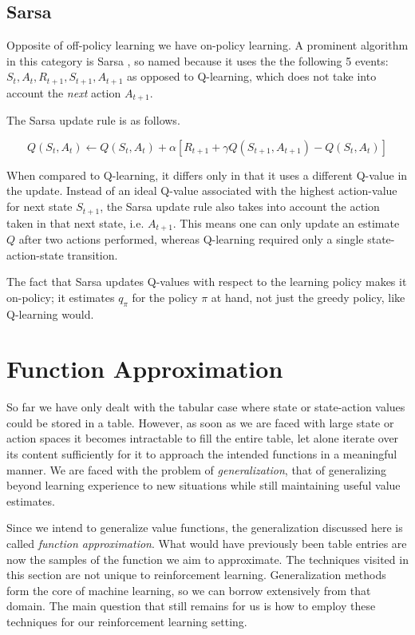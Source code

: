 \subsection{Sarsa}
\label{sub:sarsa}
Opposite of off-policy learning we have on-policy learning.
A prominent algorithm in this category is Sarsa
\parencite{rummery1994line},
so named because it uses the the following 5 events:
$S_t, A_t, R_{t+1}, S_{t+1}, A_{t+1}$
as opposed to Q-learning, which does not take into account
the \textit{next} action $A_{t+1}$.

The Sarsa update rule is as follows.

\begin{equation}
  \label{eq:sarsa}
  Q(S_t, A_t) \leftarrow Q(S_t, A_t) + \alpha \left[ R_{t+1} + \gamma Q(S_{t+1}, A_{t+1}) - Q(S_t, A_t) \right]
\end{equation}

When compared to Q-learning,
it differs only in that it uses a different Q-value in the update.
Instead of an ideal Q-value associated with the highest action-value
for next state $S_{t+1}$,
the Sarsa update rule also takes into account
the action taken in that next state, i.e. $A_{t+1}$.
This means one can only update an estimate $Q$
after two actions performed,
whereas Q-learning required only a single state-action-state transition.

The fact that Sarsa updates Q-values
with respect to the learning policy makes it on-policy;
it estimates $q_\pi$ for the policy $\pi$ at hand,
not just the greedy policy,
like Q-learning would.

\section{Function Approximation}
\label{sec:function_approximation}
So far we have only dealt with the tabular case
where state or state-action values could be stored in a table.
However, as soon as we are faced with large state or action spaces
it becomes intractable to fill the entire table,
let alone iterate over its content sufficiently
for it to approach the intended functions in a meaningful manner.
We are faced with the problem of \textit{generalization},
that of generalizing beyond learning experience to new situations
while still maintaining useful value estimates.

Since we intend to generalize value functions,
the generalization discussed here is called \textit{function approximation}.
What would have previously been table entries
are now the samples of the function we aim to approximate.
The techniques visited in this section are not unique to reinforcement learning.
Generalization methods form the core of machine learning,
so we can borrow extensively from that domain.
The main question that still remains for us is how to employ
these techniques for our reinforcement learning setting.

